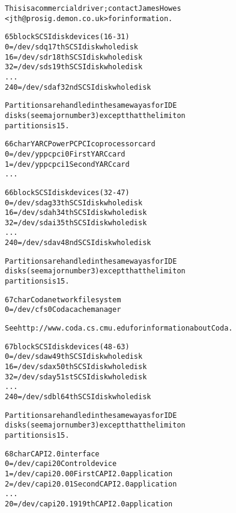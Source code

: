 \documentclass[a4paper,8pt,english]{sphinxmanual}
\begin{document}
\begin{alltt}
                This is a commercial driver; contact James Howes
                \textless{}jth@prosig.demon.co.uk\textgreater{} for information.

  65 block      SCSI disk devices (16-31)
                  0 = /dev/sdq          17th SCSI disk whole disk
                 16 = /dev/sdr          18th SCSI disk whole disk
                 32 = /dev/sds          19th SCSI disk whole disk
                    ...
                240 = /dev/sdaf         32nd SCSI disk whole disk

                Partitions are handled in the same way as for IDE
                disks (see major number 3) except that the limit on
                partitions is 15.

  66 char       YARC PowerPC PCI coprocessor card
                  0 = /dev/yppcpci0     First YARC card
                  1 = /dev/yppcpci1     Second YARC card
                    ...

  66 block      SCSI disk devices (32-47)
                  0 = /dev/sdag         33th SCSI disk whole disk
                 16 = /dev/sdah         34th SCSI disk whole disk
                 32 = /dev/sdai         35th SCSI disk whole disk
                    ...
                240 = /dev/sdav         48nd SCSI disk whole disk

                Partitions are handled in the same way as for IDE
                disks (see major number 3) except that the limit on
                partitions is 15.

  67 char       Coda network file system
                  0 = /dev/cfs0         Coda cache manager

                See http://www.coda.cs.cmu.edu for information about Coda.

  67 block      SCSI disk devices (48-63)
                  0 = /dev/sdaw         49th SCSI disk whole disk
                 16 = /dev/sdax         50th SCSI disk whole disk
                 32 = /dev/sday         51st SCSI disk whole disk
                    ...
                240 = /dev/sdbl         64th SCSI disk whole disk

                Partitions are handled in the same way as for IDE
                disks (see major number 3) except that the limit on
                partitions is 15.

  68 char       CAPI 2.0 interface
                  0 = /dev/capi20       Control device
                  1 = /dev/capi20.00    First CAPI 2.0 application
                  2 = /dev/capi20.01    Second CAPI 2.0 application
                    ...
                 20 = /dev/capi20.19    19th CAPI 2.0 application


\end{alltt}
\end{document}
